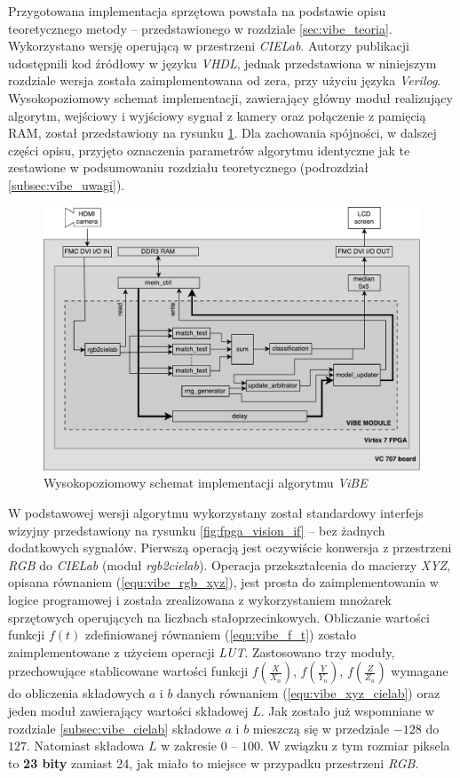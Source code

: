 Przygotowana implementacja sprzętowa powstała na podstawie opisu teoretycznego metody -- przedstawionego w rozdziale \ref{sec:vibe_teoria}. Wykorzystano wersję operującą w przestrzeni \textit{CIELab}. Autorzy publikacji \cite{kryjak_14_vibe} udostępnili kod źródłowy w języku \textit{VHDL}, jednak przedstawiona w niniejszym rozdziale wersja została zaimplementowana od zera, przy użyciu języka \textit{Verilog}.  
Wysokopoziomowy schemat implementacji, zawierający główny moduł realizujący algorytm, wejściowy i wyjściowy sygnał z kamery oraz połączenie z pamięcią RAM, został przedstawiony na rysunku \ref{fig:vibe_diagram}. 
Dla zachowania spójności, w dalszej części opisu, przyjęto oznaczenia parametrów algorytmu identyczne jak te zestawione w podsumowaniu rozdziału teoretycznego (podrozdział \ref{subsec:vibe_uwagi}).

	\begin{figure}[h!]
		\centering
		\includegraphics[scale=0.6]{img/4/vibe.pdf}
		\caption{Wysokopoziomowy schemat implementacji algorytmu \textit{ViBE}}
		\label{fig:vibe_diagram}
	\end{figure}

W podstawowej wersji algorytmu wykorzystany został standardowy interfejs wizyjny przedstawiony na rysunku \ref{fig:fpga_vision_if} -- bez żadnych dodatkowych sygnałów. 
Pierwszą operacją jest oczywiście konwersja z przestrzeni \textit{RGB} do \textit{CIELab} (moduł \textit{rgb2cielab}). 
Operacja przekształcenia do macierzy \textit{XYZ}, opisana równaniem (\ref{equ:vibe_rgb_xyz}), jest prosta do zaimplementowania w logice programowej i została zrealizowana z wykorzystaniem mnożarek sprzętowych operujących na liczbach stałoprzecinkowych. 
Obliczanie wartości funkcji $f(t)$ zdefiniowanej równaniem (\ref{equ:vibe_f_t}) zostało zaimplementowane z użyciem operacji \textit{LUT}. 
Zastosowano trzy moduły, przechowujące stablicowane wartości funkcji $f(\frac{X}{X_n})$, $f(\frac{Y}{Y_n})$, $f(\frac{Z}{Z_n})$ wymagane do obliczenia składowych $a$ i $b$ danych równaniem (\ref{equ:vibe_xyz_cielab}) oraz jeden moduł zawierający wartości składowej $L$. 
Jak zostało już wspomniane w rozdziale \ref{subsec:vibe_cielab} składowe $a$ i $b$ mieszczą się w przedziale $-128$ do $127$. 
Natomiast składowa $L$ w zakresie $0$ -- $100$. 
W związku z tym rozmiar piksela to \textbf{23 bity} zamiast 24, jak miało to miejsce w przypadku przestrzeni \textit{RGB}.

